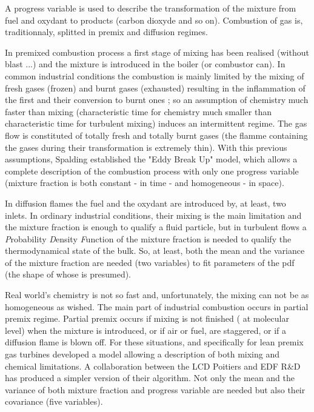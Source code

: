 A progress variable is used to describe the transformation of the mixture from
fuel and oxydant to products (carbon dioxyde and so on).
Combustion of gas is, traditionnaly, splitted in premix and diffusion regimes.

In premixed combustion process a first stage of mixing has been realised
(without blast ...) and the mixture is introduced in the boiler (or combustor
can). In common industrial conditions the combustion is mainly limited by the
mixing of fresh gases (frozen) and burnt gases (exhausted) resulting in the
inflammation of the first and their conversion to burnt ones ; so an assumption
of chemistry much faster than mixing (characteristic time for chemistry much
smaller than characteristic time for turbulent mixing) induces an intermittent
regime. The gas flow is constituted of totally fresh and totally burnt gases
(the flamme containing the gases during their transformation is extremely
thin). With this previous assumptions, Spalding \cite{Spalding:1971a} established the "Eddy
Break Up" model, which allows a complete description of the combustion process
with only one progress variable (mixture fraction is both constant
- in time - and homogeneous - in space).

In diffusion flames the fuel and the oxydant are introduced by, at least, two
inlets. In ordinary industrial conditions, their mixing is the main limitation
and the mixture fraction is enough to qualify a fluid particle, but in turbulent
flows a {\em P}robability {\em D}ensity {\em F}unction of the mixture fraction
is needed to qualify the thermodynamical state of the bulk. So, at least, both
the mean and the variance of the mixture fraction are needed (two variables) to
fit parameters of the pdf (the shape of whose is presumed).

Real world's chemistry is not so fast and, unfortunately, the mixing can not be
as homogeneous as wished. The main part of industrial combustion occurs in
partial premix regime. Partial premix occurs if mixing is not finished ( at
molecular level) when the mixture is introduced, or if air or fuel, are
staggered, or if a diffusion flame is blown off. For these situations, and
specifically for lean premix gas turbines \cite{Libby:2000a} developed a model allowing a
description of both mixing and chemical limitations. A collaboration between the
LCD Poitiers \cite{Ribert:2004a} and EDF R\&D has produced a simpler version of their
algorithm. Not only the mean and the variance of both mixture fraction and
progress variable are needed but also their covariance (five variables).


